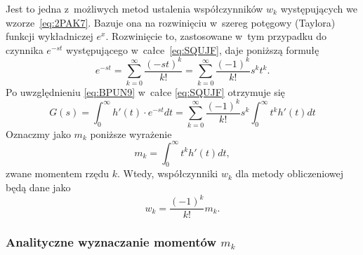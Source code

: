 \documentclass[paper=a4,DIV=12]{lpas}
\begin{document}
\begin{appendices}
  Jest to jedna z~możliwych metod ustalenia współczynników $w_k$ występujących
  we wzorze~\eqref{eq:2PAK7}. Bazuje ona na rozwinięciu w~szereg potęgowy
  (Taylora) funkcji wykładniczej $e^x$. Rozwinięcie to, zastosowane w~tym
  przypadku do czynnika $e^{-st}$ występującego w~całce~\eqref{eq:SQUJF},
  daje poniższą formułę
  \begin{equation}
    e^{-st} = \sum_{k=0}^{\infty}{\frac{(-st)^k}{k!}}
            = \sum_{k=0}^{\infty}{\frac{(-1)^k}{k!} s^k t^k }.
    \label{eq:BPUN9}
  \end{equation}
  Po uwzględnieniu \eqref{eq:BPUN9} w~całce \eqref{eq:SQUJF} otrzymuje się
  \begin{equation}
    G(s) = \int_0^{\infty}{h'(t) \cdot e^{-s t} dt}
    = \sum_{k=0}^{\infty}{\frac{(-1)^k}{k!}s^k \int_0^{\infty}{t^k h'(t) dt}}
  \end{equation}
  Oznaczmy jako $m_k$ poniższe wyrażenie
  \begin{equation}
    m_k = \int_0^{\infty}{t^k h'(t) dt},
    \label{eq:6658Y}
  \end{equation}
  zwane momentem rzędu $k$. Wtedy, współczynniki $w_k$ dla metody obliczeniowej
  będą dane jako
  \begin{equation}
    w_k = \frac{(-1)^k}{k!} m_k.
    \label{eq:W0DJC}
  \end{equation}

  \subsubsection{Analityczne wyznaczanie momentów \texorpdfstring{$m_k$}{mk}}


\end{appendices}
\end{document}

